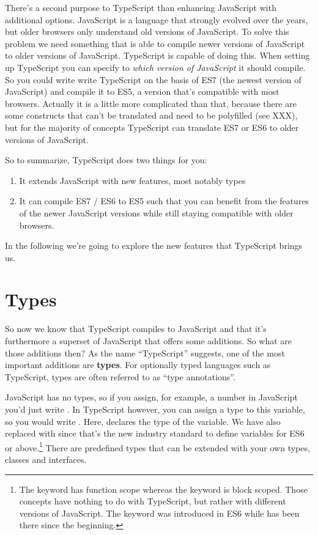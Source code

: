 \documentclass[12pt,a4paper]{report}
\newcommand{\code}[1]{\fbox{\texttt{#1}}}
\begin{document}
There's a second purpose to TypeScript than enhancing JavaScript with additional options. JavaScript is a language that strongly evolved over the years, but older browsers only understand old versions of JavaScript. To solve this problem we need something that is able to compile newer versions of JavaScript to older versions of JavaScript. TypeScript is capable of doing this. When setting up TypeScript you can specify to \textit{which version of JavaScript} it should compile. So you could write write TypeScript on the basis of ES7 (the newest version of JavaScript) and compile it to ES5, a version that's compatible with most browsers. Actually it is a little more complicated than that, because there are some constructs that can't be translated and need to be polyfilled (see XXX), but for the majority of concepts TypeScript can translate ES7 or ES6 to older versions of JavaScript.

So to summarize, TypeScript does two things for you:
\begin{enumerate}
\item{It extends JavaScript with new features, most notably types}
\item{It can compile ES7 / ES6 to ES5 such that you can benefit from the features of the newer JavaScript versions while still staying compatible with older browsers.}
\end{enumerate}

In the following we're going to explore the new features that TypeScript brings us.


\section{Types}

So now we know that TypeScript compiles to JavaScript and that it's furthermore a superset of JavaScript that offers some additions. So what are those additions then? As the name ``TypeScript'' suggests, one of the most important additions are \textbf{types}. For optionally typed languages such as TypeScript, types are often referred to as ``type annotations''.

JavaScript has no types, so if you assign, for example, a number in JavaScript you'd just write \code{var x = 5}. In TypeScript however, you can assign a type to this variable, so you would write \code{let x: number = 5}. Here, \code{number} declares the type of the variable. We have also replaced \code{var} with \code{let} since that's the new industry standard to define variables for ES6 or above.\footnote{The \code{var} keyword has function scope whereas the \code{let} keyword is block scoped. Those concepts have nothing to do with TypeScript, but rather with different versions of JavaScript. The keyword \code{let} was introduced in ES6 while \code{var} has been there since the beginning.} There are predefined types that can be extended with your own types, classes and interfaces.
\end{document}
